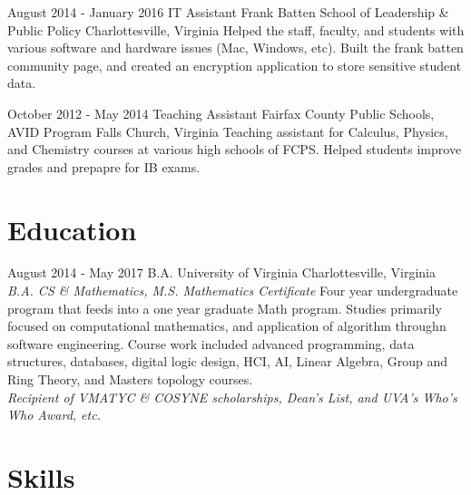 \documentclass[11pt,a4paper,sans]{moderncv}        %
\begin{document}
\cventry
  {August 2014 - January 2016}
  {IT Assistant}
  {Frank Batten School of Leadership \& Public Policy}
  {Charlottesville, Virginia}{}
  {Helped the staff, faculty, and students with various software and hardware issues (Mac, Windows, etc). Built the frank batten community page, and created an encryption application to store sensitive student data.}

\cventry
  {October 2012 - May 2014}
  {Teaching Assistant }
  {Fairfax County Public Schools, AVID Program}
  {Falls Church, Virginia}{}
  {Teaching assistant for Calculus, Physics, and Chemistry courses at various high schools of FCPS. Helped students improve grades and prepapre for IB exams. }


\section{Education}

\cventry
  {August 2014 - May 2017}
  {B.A.}
  {University of Virginia}
  {Charlottesville, Virginia}
  {\textit{B.A. CS \& Mathematics, M.S. Mathematics Certificate}}
  {Four year undergraduate program that feeds into a one year graduate Math program. Studies primarily focused on  computational mathematics, and application of algorithm throughn software engineering. Course work included advanced programming, data structures, databases, digital logic design, HCI, AI, Linear Algebra, Group and Ring Theory, and Masters topology courses. \\\textit{Recipient of VMATYC \& COSYNE scholarships, Dean's List, and UVA's Who's Who Award, etc.}}


\section{Skills}


\nocite{*}

\end{document}
